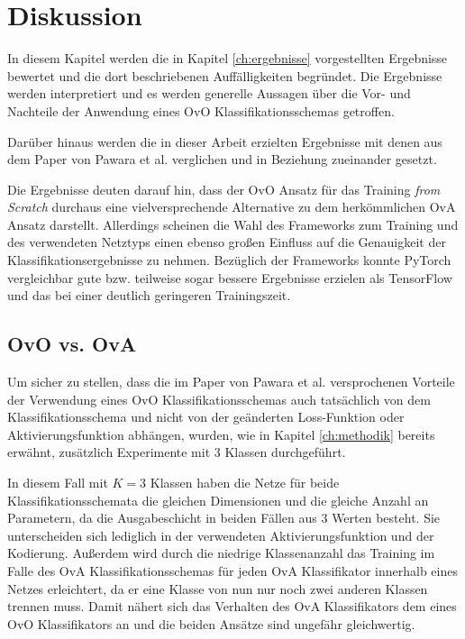 \chapter{Diskussion}
\label{ch:diskussion}
In diesem Kapitel werden die in Kapitel \ref{ch:ergebnisse} vorgestellten Ergebnisse bewertet und die dort beschriebenen Auffälligkeiten begründet. Die Ergebnisse werden interpretiert und es werden generelle Aussagen über die Vor- und Nachteile der Anwendung eines OvO Klassifikationsschemas getroffen.

Darüber hinaus werden die in dieser Arbeit erzielten Ergebnisse mit denen aus dem Paper von Pawara et al. \cite{pawaraPaper} verglichen und in Beziehung zueinander gesetzt.

Die Ergebnisse deuten darauf hin, dass der OvO Ansatz für das Training \textit{from Scratch} durchaus eine vielversprechende Alternative zu dem herkömmlichen OvA Ansatz darstellt. Allerdings scheinen die Wahl des Frameworks zum Training und des verwendeten Netztyps einen ebenso großen Einfluss auf die Genauigkeit der Klassifikationsergebnisse zu nehmen. Bezüglich der Frameworks konnte PyTorch \cite{pytorch} vergleichbar gute bzw. teilweise sogar bessere Ergebnisse erzielen als TensorFlow \cite{tensorflow} und das bei einer deutlich geringeren Trainingszeit.


\section{OvO vs. OvA}
\label{ch:diskussionOvOvsOvA}
Um sicher zu stellen, dass die im Paper von Pawara et al. \cite{pawaraPaper} versprochenen Vorteile der Verwendung eines OvO Klassifikationsschemas auch tatsächlich von dem Klassifikationsschema und nicht von der geänderten Loss-Funktion oder Aktivierungsfunktion abhängen, wurden, wie in Kapitel \ref{ch:methodik} bereits erwähnt, zusätzlich Experimente mit 3 Klassen durchgeführt.


In diesem Fall mit $K=3$ Klassen haben die Netze für beide Klassifikationsschemata die gleichen Dimensionen und die gleiche Anzahl an Parametern, da die Ausgabeschicht in beiden Fällen aus $3$ Werten besteht. Sie unterscheiden sich lediglich in der verwendeten Aktivierungsfunktion und der Kodierung. Außerdem wird durch die niedrige Klassenanzahl das Training im Falle des OvA Klassifikationsschemas für jeden OvA Klassifikator innerhalb eines Netzes erleichtert, da er eine Klasse von nun nur noch zwei anderen Klassen trennen muss. Damit nähert sich das Verhalten des OvA Klassifikators dem eines OvO Klassifikators an und die beiden Ansätze sind ungefähr gleichwertig.


